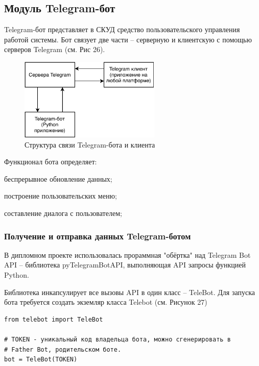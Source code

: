 \subsection{Модуль Telegram-бот}

Telegram-бот представляет в СКУД средство пользовательского управления работой
системы. Бот связует две части -- серверную и клиентскую с помощью серверов
Telegram (см. Рис 26).

\begin{figure}[h!]
  \centering
  \setlength{\fboxsep}{5pt}
  \includegraphics[width=0.6\textwidth]{data-visualisation/telegram-bot-arch}
  \vspace*{6pt}
  \caption{Структура связи Telegram-бота и клиента}\label{fig:image-processing}
\end{figure}

Функционал бота определяет:

\begin{itemize*}
\item беспрерывное обновление данных;
\item построение пользовательских меню;
\item составление диалога с пользователем;
\end{itemize*}

\subsubsection{Получение и отправка данных Telegram-ботом}

В дипломном проекте использовалась прораммная "обёртка" над Telegram Bot API -- библиотека pyTelegramBotAPI, выполняющая API запросы функцией Python. 

Библиотека инкапсулирует все вызовы API в один класс -- TeleBot. Для запуска бота требуется создать экземляр класса Telebot (см. Рисунок 27)

\begin{lstlisting}
from telebot import TeleBot

# TOKEN - уникальный код владельца бота, можно сгенерировать в 
# Father Bot, родительском боте. 
bot = TeleBot(TOKEN)
\end{lstlisting}

